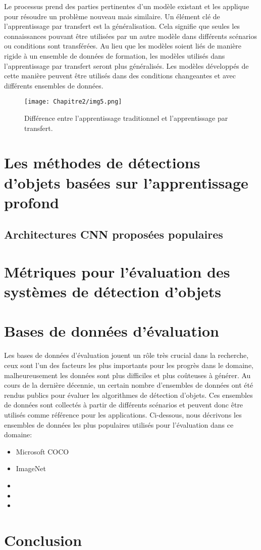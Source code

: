      Le processus prend des parties pertinentes d'un modèle existant et les applique pour résoudre un problème nouveau mais similaire. Un élément clé de l'apprentissage par transfert est la généralisation. Cela signifie que seules les connaissances pouvant être utilisées par un autre modèle dans différents scénarios ou conditions sont transférées. Au lieu que les modèles soient liés de manière rigide à un ensemble de données de formation, les modèles utilisés dans l'apprentissage par transfert seront plus généralisés. Les modèles développés de cette manière peuvent être utilisés dans des conditions changeantes et avec différents ensembles de données.
     \begin{figure}[H]
          \centering
          \texttt{[image: Chapitre2/img5.png]}
          \caption{Différence entre l'apprentissage traditionnel et l'apprentissage par transfert.}
          \label{img5}
          \end{figure}

\section{Les méthodes de détections d'objets basées sur l'apprentissage profond} 
     \subsection{Architectures CNN proposées populaires} 

\section{Métriques pour l'évaluation des systèmes de détection d'objets} 

\section{Bases de données d'évaluation} 
Les bases de données d'évaluation jouent un rôle très crucial dans la recherche, ceux sont l'un des facteurs les plus importants pour les progrès dans le domaine, malheureusement les données sont plus difficiles et plus coûteuses à générer. Au cours de la dernière décennie, un certain nombre d'ensembles de données ont été rendus publics pour évaluer les algorithmes de détection d'objets. Ces ensembles de données sont collectés à partir de différents scénarios et peuvent donc être utilisés comme référence pour les applications. Ci-dessous, nous décrivons les ensembles de données  les plus populaires utilisés pour l'évaluation dans ce domaine:

\begin{itemize}
\item Microsoft COCO \cite{db1}

\item ImageNet \cite{db2}
\item 
\item 
\item 
\end{itemize}



\section{Conclusion} 

